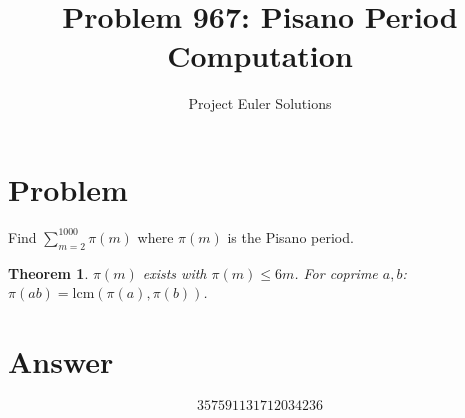 \documentclass[11pt]{article}
\title{Problem 967: Pisano Period Computation}
\author{Project Euler Solutions}
\date{}
\newtheorem{theorem}{Theorem}
\begin{document}
\maketitle
\section{Problem}
Find $\sum_{m=2}^{1000} \pi(m)$ where $\pi(m)$ is the Pisano period.
\begin{theorem}
$\pi(m)$ exists with $\pi(m) \le 6m$. For coprime $a,b$: $\pi(ab) = \mathrm{lcm}(\pi(a), \pi(b))$.
\end{theorem}
\section{Answer}

\[
\boxed{357591131712034236}
\]
\end{document}
